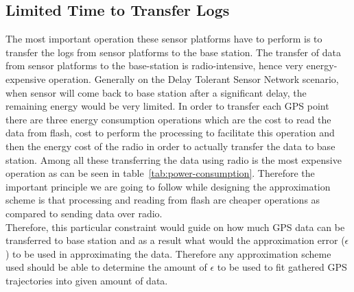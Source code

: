 \documentclass[conference]{IEEEtran}
\begin{document}
\subsection{Limited Time to Transfer Logs} \label{limited-time}
The most important operation these sensor platforms have to perform is to transfer the logs from sensor platforms to the 
base station. The transfer of data from sensor platforms to the base-station is radio-intensive, hence very 
energy-expensive operation. Generally on the Delay Tolerant Sensor Network scenario, when sensor will come back 
to base station after a significant delay, the remaining energy would be very limited. In order to transfer each GPS 
point there are three energy consumption operations which are the cost to read the data from flash, cost to perform 
the processing to facilitate this operation and then the energy cost of the radio in order to actually transfer the data 
to base station. Among all these transferring the data using radio is the most expensive operation as can be seen in 
table~\ref{tab:power-consumption}. Therefore the important principle we are going to follow while designing the approximation 
scheme is that processing and reading from flash are cheaper operations as compared to sending data over radio. 
\\
Therefore, this particular constraint would guide on how much GPS data can be transferred to base 
station and as a result what would the approximation error ($\epsilon$) to be used in approximating the data. 
Therefore any approximation scheme used should be able to determine the amount of $\epsilon$ 
to be used to fit gathered GPS trajectories into given amount of data.\
%
%
\end{document}
